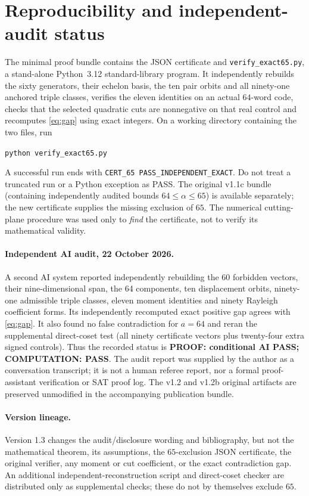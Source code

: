 \documentclass[11pt,a4paper]{article}
\begin{document}
\section{Reproducibility and independent-audit status}
The minimal proof bundle contains the JSON certificate and \texttt{verify\_exact65.py}, a stand-alone Python~3.12 standard-library program. It independently rebuilds the sixty generators, their echelon basis, the ten pair orbits and all ninety-one anchored triple classes, verifies the eleven identities on an actual $64$-word code, checks that the selected quadratic cuts are nonnegative on that real control and recomputes \eqref{eq:gap} using exact integers. On a working directory containing the two files, run
\begin{center}\texttt{python verify\_exact65.py}\end{center}
A successful run ends with \texttt{CERT\_65 PASS\_INDEPENDENT\_EXACT}. Do not treat a truncated run or a Python exception as PASS. The original v1.1c bundle (containing independently audited bounds $64\le\alpha\le65$) is available separately; the new certificate supplies the missing exclusion of $65$. The numerical cutting-plane procedure was used only to \emph{find} the certificate, not to verify its mathematical validity.

\paragraph{Independent AI audit, 22 October 2026.} A second AI system reported independently rebuilding the 60 forbidden vectors, their nine-dimensional span, the 64 components, ten displacement orbits, ninety-one admissible triple classes, eleven moment identities and ninety Rayleigh coefficient forms. Its independently recomputed exact positive gap agrees with \eqref{eq:gap}. It also found no false contradiction for $a=64$ and reran the supplemental direct-coset test (all ninety certificate vectors plus twenty-four extra signed controls). Thus the recorded status is \textbf{PROOF: conditional AI PASS; COMPUTATION: PASS}. The audit report was supplied by the author as a conversation transcript; it is not a human referee report, nor a formal proof-assistant verification or SAT proof log. The v1.2 and v1.2b original artifacts are preserved unmodified in the accompanying publication bundle.\par
\paragraph{Version lineage.} Version 1.3 changes the audit/disclosure wording and bibliography, but not the mathematical theorem, its assumptions, the $65$-exclusion JSON certificate, the original verifier, any moment or cut coefficient, or the exact contradiction gap. An additional independent-reconstruction script and direct-coset checker are distributed only as supplemental checks; these do not by themselves exclude $65$.
\end{document}
